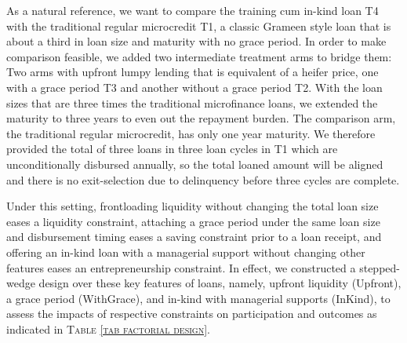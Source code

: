 	As a natural reference, we want to compare the training cum in-kind loan \textsf{T4} with the traditional regular microcredit \textsf{T1}, a classic Grameen style loan that is about a third in loan size and maturity with no grace period. In order to make comparison feasible, we added two intermediate treatment arms to bridge them: Two arms with upfront lumpy lending that is equivalent of a heifer price, one with a grace period \textsf{T3} and another without a grace period \textsf{T2}. With the loan sizes that are three times the traditional microfinance loans, we extended the maturity to three years to even out the repayment burden. The comparison arm, the traditional regular microcredit, has only one year maturity. We therefore provided the total of three loans in three loan cycles in \textsf{T1} which are unconditionally disbursed annually, so the total loaned amount will be aligned and there is no exit-selection due to delinquency before three cycles are complete. 
	
	Under this setting, frontloading liquidity without changing the total loan size eases a liquidity constraint, attaching a grace period under the same loan size and disbursement timing eases a saving constraint prior to a loan receipt, and offering an in-kind loan with a managerial support without changing other features eases an entrepreneurship constraint. In effect, we constructed a stepped-wedge design over these key features of loans, namely, upfront liquidity (\textsf{Upfront}), a grace period (\textsf{WithGrace}), and in-kind with managerial supports (\textsf{InKind}), to assess the impacts of respective constraints on participation and outcomes as indicated in \textsc{\normalsize Table \ref{tab factorial design}}. 

